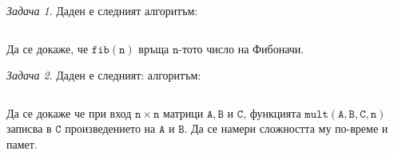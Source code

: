 \documentclass{article}
\theoremstyle{definition}
\theoremstyle{plain}
\theoremstyle{remark}
\newtheorem{problem}{Задача}
\theoremstyle{definition}
\begin{document}
\begin{problem}
Даден е следният алгоритъм:
\inputminted[linenos]{c++}{algorithms/fibonacci.cpp}

Да се докаже, че $\mathtt{fib(n)}$ връща $\mathtt{n}$-тото число на Фибоначи.
\end{problem}

\begin{problem}
Даден е следният: алгоритъм:
\inputminted[linenos]{c++}{algorithms/mult.cpp}

Да се докаже че при вход $\mathtt{n \times n}$ матрици $\mathtt{A, B}$ и $\mathtt{C}$, функцията $\mathtt{mult(A, B, C, n)}$ записва в $\mathtt{C}$ произведението на $\mathtt{A}$ и $\mathtt{B}$.
Да се намери сложността му по-време и памет.
\end{problem}
\end{document}
